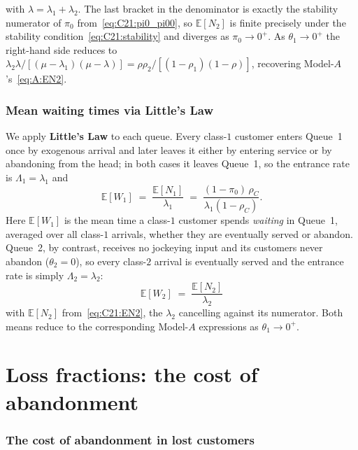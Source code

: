 \documentclass{article}
\numberwithin{equation}{section}
\begin{document}
with $\lambda=\lambda_1+\lambda_2$. The last bracket in the denominator is exactly the
stability numerator of $\pi_0$ from~\eqref{eq:C21:pi0_pi00}, so $\mathbb{E}[N_2]$ is finite
precisely under the stability condition~\eqref{eq:C21:stability} and diverges as
$\pi_0\to0^+$. As $\theta_1\to0^+$ the right-hand side reduces to
$\lambda_2\lambda/[(\mu-\lambda_1)(\mu-\lambda)]=\rho\rho_2/[(1-\rho_1)(1-\rho)]$, recovering
Model-$A$'s~\eqref{eq:A:EN2}.

\subsubsection{Mean waiting times via Little's Law}

We apply \textbf{Little's Law} to each queue. Every class-$1$ customer enters Queue~1 once
by exogenous arrival and later leaves it either by entering service or by abandoning from the
head; in both cases it leaves Queue~1, so the entrance rate is $\Lambda_1=\lambda_1$ and
\begin{equation*}
    \mathbb{E}[W_1] \;=\; \frac{\mathbb{E}[N_1]}{\lambda_1}
    \;=\; \frac{(1-\pi_0)\,\rho_C}{\lambda_1(1-\rho_C)}.
\end{equation*}
Here $\mathbb{E}[W_1]$ is the mean time a class-$1$ customer spends \emph{waiting} in
Queue~1, averaged over all class-$1$ arrivals, whether they are eventually served or
abandon. Queue~2, by contrast, receives no jockeying input and its customers never abandon
($\theta_2=0$), so every class-$2$ arrival is eventually served and the entrance rate is
simply $\Lambda_2=\lambda_2$:
\begin{equation*}
    \mathbb{E}[W_2] \;=\; \frac{\mathbb{E}[N_2]}{\lambda_2}
\end{equation*}
with $\mathbb{E}[N_2]$ from~\eqref{eq:C21:EN2}, the $\lambda_2$ cancelling against its
numerator. Both means reduce to the corresponding Model-$A$ expressions as $\theta_1\to0^+$.

\section{Loss fractions: the cost of abandonment}

\subsubsection{The cost of abandonment in lost customers}
\label{subsec:comp:abandonment}
\end{document}

